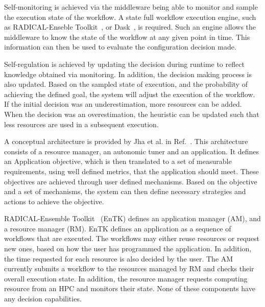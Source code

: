 Self-monitoring is achieved via the middleware being able to monitor and sample 
the execution state of the workflow. A state full workflow execution engine, such as 
RADICAL-Enseble Toolkit~\cite{balasubramanian2018harnessing}, or Dask~\cite{rocklin2015dask}, 
is required. Such an engine allows the middleware to know the state of the workflow 
at any given point in time. This information can then be used to evaluate the 
configuration decision made.

Self-regulation is achieved by updating the decision during runtime to reflect 
knowledge obtained via monitoring. In addition, the decision making process 
is also updated. Based on the sampled state of execution, and the probability 
of achieving the defined goal, the system will adjust the execution of the 
workflow. If the initial decision was an underestimation, 
more resources can be added. When the decision was an overestimation, the heuristic 
can be updated such that less resources are used in a subsequent execution.


A conceptual architecture is provided by Jha et al. in Ref.~\cite{jha2009self}. 
This architecture consists of a resource manager, an autonomic tuner and an application. 
It defines an Application objective, which is then translated to a set of measurable 
requirements, using well defined metrics, that the application should meet. These 
objectives are achieved through user defined mechanisms. Based on the objective and 
a set of mechanisms, the system can then define necessary strategies and actions to 
achieve the objective.

RADICAL-Ensemble Toolkit~\cite{balasubramanian2018harnessing} (EnTK) defines 
an application manager (AM), and a resource manager (RM). EnTK defines an 
application as a sequence of workflows that are executed. The workflows may 
either reuse resources or request new ones, based on how the user has programmed 
the application. In addition, the time requested for each resource is also 
decided by the user. The AM currently submits a workflow to the resources 
managed by RM and checks their overall execution state. In addition, the resource 
manager requests computing resource from an HPC and monitors their state. None 
of these components have any decision capabilities.

